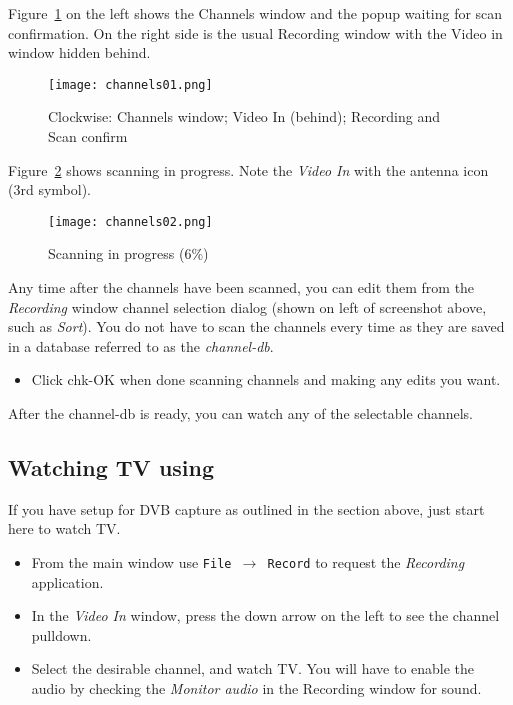 Figure~\ref{fig:channels01} on the left shows the Channels window and the popup waiting for scan confirmation.  On the right side is the usual Recording window with the Video in window hidden behind.

\begin{figure}[htpb]
    \centering
    \texttt{[image: channels01.png]}
    \caption{Clockwise: Channels window; Video In (behind); Recording and Scan confirm}
    \label{fig:channels01}
\end{figure}

Figure~\ref{fig:channels02} shows scanning in progress.  Note the \textit{Video In} with the antenna icon (3rd symbol).

\begin{figure}[htpb]
    \centering
    \texttt{[image: channels02.png]}
    \caption{Scanning in progress ($6\%$)}
    \label{fig:channels02}
\end{figure}

Any time after the channels have been scanned, you can edit them from the \textit{Recording} window channel selection dialog (shown on left of screenshot above, such as \textit{Sort}).  You do not have to scan the channels every time as they are saved in a database referred to as the \textit{channel-db}.

\begin{itemize}
    \item Click chk-OK when done scanning channels and making any edits you want.
\end{itemize}

\noindent After the channel-db is ready, you can watch any of the selectable channels.

\subsection{Watching TV using \CGG{}}%
\label{sub:watching_tv_cinelerra}

If you have setup for DVB capture as outlined in the section above, just start here to watch TV.

\begin{itemize}
    \item From the main window use  \texttt{File $\rightarrow$ Record}   to request  the \textit{Recording} application.
    \item In the \textit{Video In} window, press the down arrow on the left to see the channel pulldown.
    \item Select the desirable channel, and watch TV.  You will have to enable the audio by checking the \textit{Monitor audio} in the Recording window for sound.
\end{itemize}

